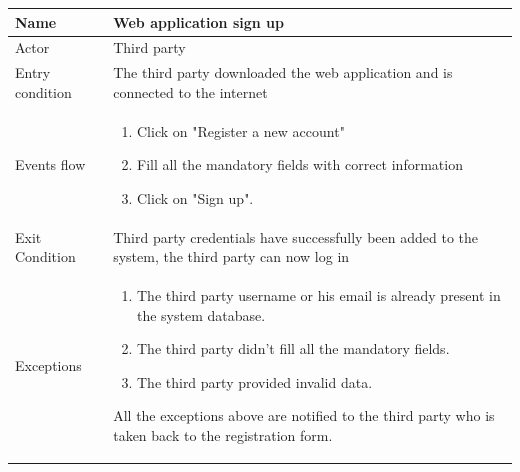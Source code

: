 \givespace

\begin{tabular}{|l|p{11cm}|}
    \hline
    Name & Web application sign up
    \\ \hline
    Actor & Third party
    \\ \hline 
    Entry condition & The third party downloaded the web application and is connected to the internet
    \\ \hline
    Events flow &
    \begin{enumerate}
    \item Click on "Register a new account"
    \item Fill all the mandatory fields with correct information
    \item Click on "Sign up".
    \end{enumerate}
     \\ \hline
     Exit Condition & Third party credentials have successfully been added to the system,
     the third party can now log in     
     \\
    \hline
    Exceptions &
        \begin{enumerate}
    \item The third party username or his email is already present in the system database.
    \item The third party didn't fill all the mandatory fields.
    \item The third party provided invalid data.
    \end{enumerate}
    All the exceptions above are notified to the third party who is taken back to the registration form.
      \\
    \hline
\end{tabular}

\givespace

